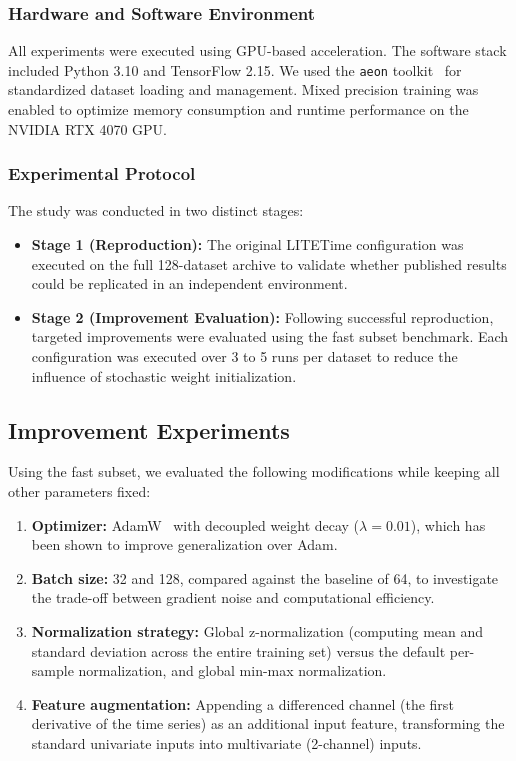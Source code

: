 \documentclass[conference]{IEEEtran}
\begin{document}
\subsubsection{Hardware and Software Environment}
All experiments were executed using GPU-based acceleration. The software stack included Python 3.10 and TensorFlow 2.15. We used the \texttt{aeon} toolkit~\cite{aeon2024} for standardized dataset loading and management. Mixed precision training was enabled to optimize memory consumption and runtime performance on the NVIDIA RTX 4070 GPU.

\subsubsection{Experimental Protocol}
The study was conducted in two distinct stages:
\begin{itemize}
    \item \textbf{Stage 1 (Reproduction):} The original LITETime configuration was executed on the full 128-dataset archive to validate whether published results could be replicated in an independent environment.
    \item \textbf{Stage 2 (Improvement Evaluation):} Following successful reproduction, targeted improvements were evaluated using the fast subset benchmark. Each configuration was executed over 3 to 5 runs per dataset to reduce the influence of stochastic weight initialization.
\end{itemize}

\subsection{Improvement Experiments}
Using the fast subset, we evaluated the following modifications while keeping all other parameters fixed:

\begin{enumerate}
    \item \textbf{Optimizer:} AdamW~\cite{loshchilov2019adamw} with decoupled weight decay ($\lambda=0.01$), which has been shown to improve generalization over Adam.
    \item \textbf{Batch size:} 32 and 128, compared against the baseline of 64, to investigate the trade-off between gradient noise and computational efficiency.
    \item \textbf{Normalization strategy:} Global z-normalization (computing mean and standard deviation across the entire training set) versus the default per-sample normalization, and global min-max normalization.
    \item \textbf{Feature augmentation:} Appending a differenced channel (the first derivative of the time series) as an additional input feature, transforming the standard univariate inputs into multivariate (2-channel) inputs.
\end{enumerate}
\end{document}
